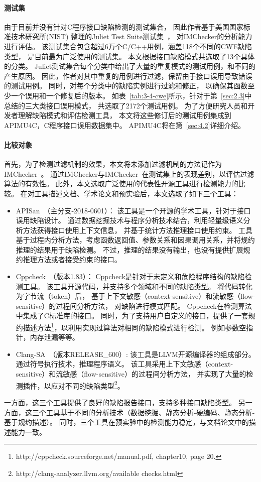 \paragraph{测试集} 由于目前并没有针对C程序接口缺陷检测的测试集合，
因此作者基于美国国家标准技术研究所(NIST) 整理的Juliet Test Suite测试集~\cite{juliet}，
对IMChecker的分析能力进行评估。
该测试集合包含超过6万个C/C++用例，涵盖118个不同的CWE缺陷类型，
是目前最为广泛使用的测试集。
本文根据接口缺陷模式共选取了13个具体的分类。
Juliet测试集合每个分类中给出了大量的重复模式的测试用例，和不同的产生原因。
因此，作者对其中重复的用例进行过滤，保留由于接口误用导致错误的测试用例。
同时，对每个分类中的缺陷实例进行过滤和修正，
以确保其函数至少一个误用和一个修复后的版本。
如表~\ref{tab:3-4-cwe}所示，针对于第~\ref{sec:2.3}中总结的三大类接口误用模式，
共选取了2172个测试用例。
为了方便研究人员和开发者理解缺陷模式和评估检测工具，
本文将这些修订后的测试用例集成到APIMU4C，C程序接口误用数据集中。
APIMU4C将在第~\ref{sec:4.2}详细介绍。




\paragraph{ 比较对象}
首先，为了检测过滤机制的效果，本文将未添加过滤机制的方法记作为IMChecker--。
通过IMChecker与IMChecker--在测试集上的表现差别，以评估过滤算法的有效性。
此外，本文选取广泛使用的代表性开源工具进行检测能力的比较。
在对工具描述文档、学术论文和预实验后，本文选取了如下三个工具：
\begin{itemize}
	\item APISan~\cite{16-sec-apisan}（主分支-2018-0601）：
	该工具是一个开源的学术工具，针对于接口误用缺陷设计。
	通过数据挖掘技术与程序分析技术结合，利用轻量级语义分析方法获得接口使用上下文信息，
	并基于统计方法推理接口使用约束。
	工具基于过程内分析方法，考虑函数返回值、参数关系和因果调用关系，并将规约推理的结果用于缺陷检测。
	不过，推理的结果没有输出，也没有提供扩展规约推理方法或者接受约束的接口。
	\item Cppcheck~\cite{cppcheck}（版本1.83）：
	Cppcheck是针对于未定义和危险程序结构的缺陷检测工具。
	该工具开源代码，并支持多个领域和不同的缺陷类型。
	将代码转化为字节流（token）后，
	基于上下文敏感（context-sensitive）和流敏感（flow-sensitive）的过程间分析方法，
	对缺陷进行模式匹配。
	Cppcheck在检测算法中集成了C标准库的接口。
	同时，为了支持用户自定义的接口，提供了一套规约描述方法\footnote{http://cppcheck.sourceforge.net/manual.pdf, chapter10, page 20.}，以利用实现过算法对相同的缺陷模式进行检测。
	例如参数空指针，内存泄漏等等。
	\item Clang-SA~\cite{clang-sa}（版本RELEASE\_600）:
	该工具是LLVM开源编译器的组成部分。
	通过符号执行技术，推理程序语义。
	该工具采用上下文敏感（context-sensitive）和流敏感（flow-sensitive）的过程间分析方法，
	并实现了大量的检测插件，以应对不同的缺陷类型\footnote{http://clang-analyzer.llvm.org/available checks.html}。
\end{itemize} 
一方面，这三个工具提供了良好的缺陷报告接口，支持多种接口缺陷类型。
另一方面，这三个工具基于不同的分析技术（数据挖掘、静态分析-硬编码、静态分析-基于规约描述）。
同时，三个工具在预实验中的检测能力稳定，与文档论文中的描述能力一致。

